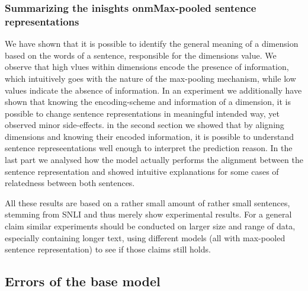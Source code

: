 \subsubsection{Summarizing the inisghts onmMax-pooled sentence representations}
We have shown that it is possible to identify the general meaning of a dimension based on the words of a sentence, responsible for the dimensions value. We observe that high vlues within dimensions encode the presence of information, which intuitively goes with the nature of the max-pooling mechanism, while low values indicate the absence of information. In an experiment we additionally have shown that knowing the encoding-scheme and information of a dimension, it is possible to change sentence representations in meaningful intended way, yet observed minor side-effects. in the second section we showed that by aligning dimensions and knowing their encoded information, it is possible to understand sentence represeentations well enough to interpret the prediction reason. In the last part we analysed how the model actually performs the alignment between the sentence representation and showed intuitive explanations for some cases of relatedness between both sentences.
\newline

\noindent
All these results are based on a rather small amount of rather small sentences, stemming from \ac{SNLI} and thus merely show experimental results. For a general claim similar experiments should be conducted on larger size and range of data, especially containing longer text, using different models (all with max-pooled sentence representation) to see if those claims still holds. 
\subsection{Errors of the base model}